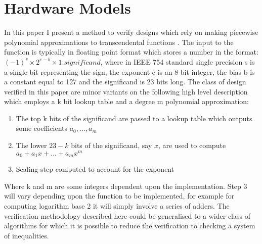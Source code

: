 \documentclass[a4]{article}
\begin{document}
\section{Hardware Models}
In this paper I present a method to verify designs which rely on making piecewise polynomial approximations to transcendental functions \cite{tang1991table,strollo2011elementary,pineiro2005high}. The input to the function is typically in floating point format \cite{goldberg1991every} which stores a number in the format: $(-1)^{s} \times 2^{e-b} \times 1.significand$, where in IEEE 754 standard single precision s is a single bit representing the sign, the exponent e is an 8 bit integer, the bias b is a constant equal to 127 and the significand is 23 bits long. The class of design verified in this paper are minor variants on the following high level description which employs a k bit lookup table and a degree m polynomial approximation:
\begin{enumerate}
\item The top k bits of the significand are passed to a lookup table which outputs some coefficients $a_0,...,a_m$
\item The lower $23-k$ bits of the significand, say $x$, are used to compute\newline $a_0+a_1x+...+a_mx^m$
\item Scaling step computed to account for the exponent
\end{enumerate} 
Where k and m are some integers dependent upon the implementation. Step 3 will vary depending upon the function to be implemented, for example for computing logarithm base 2 it will simply involve a series of adders. The verification methodology described here could be generalised to a wider class of algorithms for which it is possible to reduce the verification to checking a system of inequalities. 
\end{document}
